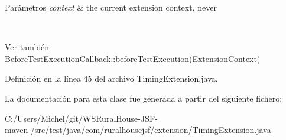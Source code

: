 \begin{DoxyParams}{Parámetros}
{\em context} & the current extension context, never
\begin{DoxyCode}{1}
\DoxyCodeLine{\textcolor{keyword}{null} }
\end{DoxyCode}
\\
\hline
\end{DoxyParams}
\begin{DoxySeeAlso}{Ver también}
Before\+Test\+Execution\+Callback\+::before\+Test\+Execution(\+Extension\+Context) 
\end{DoxySeeAlso}


Definición en la línea 45 del archivo Timing\+Extension.\+java.



La documentación para esta clase fue generada a partir del siguiente fichero\+:\begin{DoxyCompactItemize}
\item 
C\+:/\+Users/\+Michel/git/\+W\+S\+Rural\+House-\/\+J\+S\+F-\/maven-\//src/test/java/com/ruralhousejsf/extension/\mbox{\hyperlink{_timing_extension_8java}{Timing\+Extension.\+java}}\end{DoxyCompactItemize}
